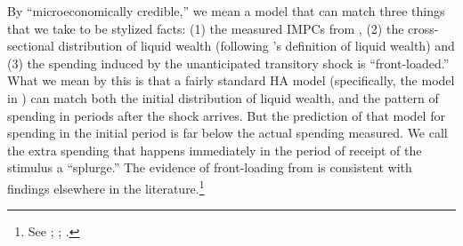 \documentclass[\econtexRoot/HAFiscal]{subfiles}
\begin{document}
By ``microeconomically credible,'' we mean a model that can match three things that we take to be stylized facts: (1) the measured IMPCs from \cite{fagereng_mpc_2021}, (2) the cross-sectional distribution of liquid wealth (following \cite{kaplan2014model}'s definition of liquid wealth) and (3) the spending induced by the unanticipated transitory shock is ``front-loaded.''  What we mean by this is that a fairly standard HA model (specifically, the model in \cite{cstwMPC}) can match both the initial distribution of liquid wealth, and the pattern of spending in periods after the shock arrives.  But the prediction of that model for spending in the initial period is far below the actual spending measured. We call the extra spending that happens immediately in the period of receipt of the stimulus a ``splurge.''  The evidence of front-loading from \cite{fagereng_mpc_2021} is consistent with findings elsewhere in the literature.\footnote{See \cite{parker2013consumer}; \cite{olafsson2018liquid}; \cite{ganongConsumer2019}.} %
\end{document}
